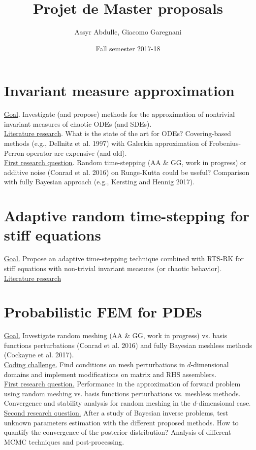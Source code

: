 \documentclass{scrartcl}
\title{Projet de Master proposals}
\author{Assyr Abdulle, Giacomo Garegnani}
\date{Fall semester 2017-18}
\begin{document}
	\maketitle
	
	\section{Invariant measure approximation}
	\underline{Goal}. Investigate (and propose) methods for the approximation of nontrivial invariant measures of chaotic ODEs (and SDEs).\\
	\underline{Literature research}. What is the state of the art for ODEs? Covering-based methods (e.g., Dellnitz et al. 1997) with Galerkin approximation of Frobenius-Perron operator are expensive (and old).\\
	\underline{First research question}. Random time-stepping (AA \& GG, work in progress) or additive noise (Conrad et al. 2016) on Runge-Kutta could be useful? Comparison with fully Bayesian approach (e.g., Kersting and Hennig 2017). 
	
	\section{Adaptive random time-stepping for stiff equations}
	\underline{Goal.} Propose an adaptive time-stepping technique combined with RTS-RK for stiff equations with non-trivial invariant measures (or chaotic behavior).\\
	\underline{Literature research} 
	
	\section{Probabilistic FEM for PDEs}
	\underline{Goal.} Investigate random meshing (AA \& GG, work in progress) vs. basis functions perturbations (Conrad et al. 2016) and fully Bayesian meshless methods (Cockayne et al. 2017).\\
	\underline{Coding challenge.} Find conditions on mesh perturbations in $d$-dimensional domains and implement modifications on matrix and RHS assemblers.\\
	\underline{First research question.} Performance in the approximation of forward problem using random meshing vs. basis functions perturbations vs. meshless methods. Convergence and stability analysis for random meshing in the $d$-dimensional case.\\
	\underline{Second research question.} After a study of Bayesian inverse problems, test unknown parameters estimation with the different proposed methods. How to quantify the convergence of the posterior distribution? Analysis of different MCMC techniques and post-processing.
		
\end{document}
